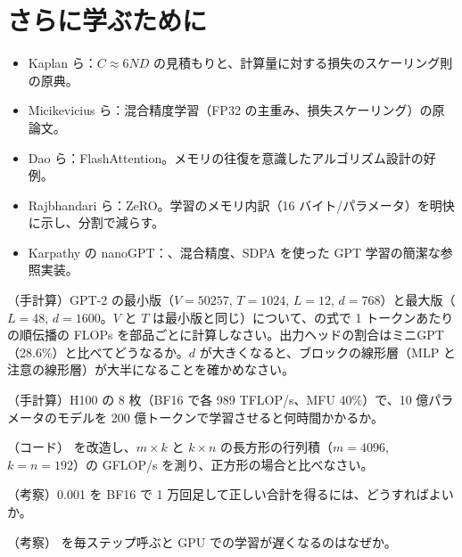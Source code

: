 \section*{さらに学ぶために}
\begin{itemize}
\item Kaplan ら\cite{kaplan2020scaling}：$C\approx6ND$ の見積もりと、計算量に対する損失のスケーリング則の原典。
\item Micikevicius ら\cite{micikevicius2018mixed}：混合精度学習（FP32 の主重み、損失スケーリング）の原論文。
\item Dao ら\cite{dao2022flashattention}：FlashAttention。メモリの往復を意識したアルゴリズム設計の好例。
\item Rajbhandari ら\cite{rajbhandari2020zero}：ZeRO。学習のメモリ内訳（16 バイト/パラメータ）を明快に示し、分割で減らす。
\item Karpathy の nanoGPT\cite{karpathy2022nanogpt}：、混合精度、SDPA を使った GPT 学習の簡潔な参照実装。
\end{itemize}

\begin{exercises}
\item （手計算）GPT-2 の最小版（$V=50257$, $T=1024$, $L=12$, $d=768$）と最大版（$L=48$, $d=1600$。$V$ と $T$ は最小版と同じ）について、の式で 1 トークンあたりの順伝播の FLOPs を部品ごとに計算しなさい。出力ヘッドの割合はミニGPT（28.6\%）と比べてどうなるか。$d$ が大きくなると、ブロックの線形層（MLP と注意の線形層）が大半になることを確かめなさい。
\item （手計算）H100 の 8 枚（BF16 で各 989 TFLOP/s、MFU 40\%）で、10 億パラメータのモデルを 200 億トークンで学習させると何時間かかるか。
\item （コード） を改造し、$m\times k$ と $k\times n$ の長方形の行列積（$m=4096$, $k=n=192$）の GFLOP/s を測り、正方形の場合と比べなさい。
\item （考察）0.001 を BF16 で 1 万回足して正しい合計を得るには、どうすればよいか。
\item （考察） を毎ステップ呼ぶと GPU での学習が遅くなるのはなぜか。
\end{exercises}

